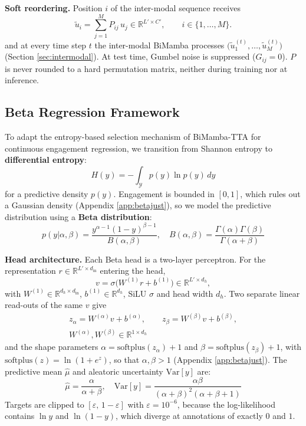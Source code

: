 \documentclass[10pt,a4paper,twocolumn]{article}
\newcommand{\R}{\mathbb{R}}
\begin{document}
	\textbf{Soft reordering.} Position $i$ of the inter-modal sequence receives
	$$\tilde{u}_i = \sum_{j=1}^{M} P_{ij}\,u_j \in \R^{L' \times C'}, \qquad i \in \{1,\dots,M\}.$$
	and at every time step $t$ the inter-modal BiMamba processes $\bigl(\tilde{u}_1^{(t)}, \dots, \tilde{u}_M^{(t)}\bigr)$ (Section \ref{sec:intermodal}). At test time, Gumbel noise is suppressed ($G_{ij} = 0$). $P$ is never rounded to a hard permutation matrix, neither during training nor at inference.
	
	\subsection{Beta Regression Framework}
	\label{sec:beta}
	To adapt the entropy-based selection mechanism of BiMamba-TTA for continuous engagement regression, we transition from Shannon entropy to \textbf{differential entropy}: $$H(y) = -\int_{\mathcal{Y}} p(y) \ln p(y) \, dy$$ for a predictive density $p(y)$. Engagement is bounded in $[0,1]$, which rules out a Gaussian density (Appendix \ref{app:betajust}), so we model the predictive distribution using a \textbf{Beta distribution}:
	$$ p(y|\alpha, \beta) = \frac{y^{\alpha-1}(1-y)^{\beta-1}}{B(\alpha, \beta)}, \quad B(\alpha, \beta) = \frac{\Gamma(\alpha)\Gamma(\beta)}{\Gamma(\alpha+\beta)} $$
	
	\textbf{Head architecture.} Each Beta head is a two-layer perceptron. For the representation $r \in \R^{L' \times d_{\text{in}}}$ entering the head, $$ v = \sigma\bigl(W^{(1)} r + b^{(1)}\bigr) \in \R^{L' \times d_h}, $$ with $W^{(1)} \in \R^{d_h \times d_{\text{in}}}$, $b^{(1)} \in \R^{d_h}$, SiLU $\sigma$ and head width $d_h$. Two separate linear read-outs of the same $v$ give
	$$\begin{gathered} z_\alpha = W^{(\alpha)} v + b^{(\alpha)}, \qquad z_\beta = W^{(\beta)} v + b^{(\beta)}, \\ W^{(\alpha)}, W^{(\beta)} \in \R^{1 \times d_h}\end{gathered}$$
	and the shape parameters $\alpha = \text{softplus}(z_\alpha) + 1$ and $\beta = \text{softplus}(z_\beta) + 1$, with $\text{softplus}(z) = \ln(1+e^{z})$, so that $\alpha, \beta > 1$ (Appendix \ref{app:betajust}). The predictive mean $\hat{\mu}$ and aleatoric uncertainty $\text{Var}[y]$ are:
	$$ \hat{\mu} = \frac{\alpha}{\alpha + \beta}, \quad \text{Var}[y] = \frac{\alpha\beta}{(\alpha+\beta)^2(\alpha+\beta+1)} $$
	Targets are clipped to $[\varepsilon,\, 1-\varepsilon]$ with $\varepsilon = 10^{-6}$, because the log-likelihood contains $\ln y$ and $\ln(1-y)$, which diverge at annotations of exactly $0$ and $1$.
\end{document}
